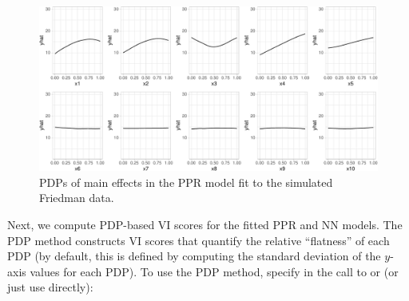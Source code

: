 \begin{Schunk}
\begin{figure}[!htb]

{\centering \includegraphics[width=1\linewidth]{greenwell-boehmke_files/figure-latex/pdp-ppr-1}

}

\caption[PDPs of main effects in the PPR model fit to the simulated Friedman data]{PDPs of main effects in the PPR model fit to the simulated Friedman data.}\label{fig:pdp-ppr}
\end{figure}
\end{Schunk}

Next, we compute PDP-based VI scores for the fitted PPR and NN models.
The PDP method constructs VI scores that quantify the relative
``flatness'' of each PDP (by default, this is defined by computing the
standard deviation of the \(y\)-axis values for each PDP). To use the
PDP method, specify  in the call to  or
 (or just use  directly):

